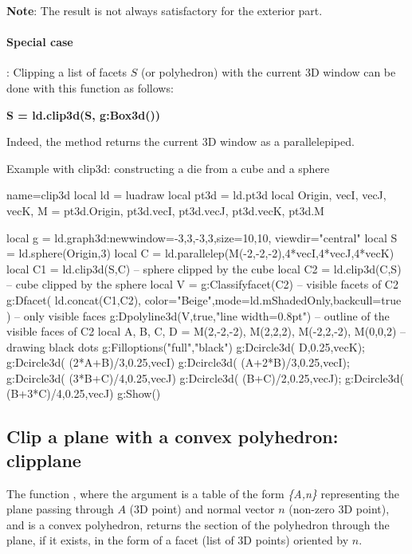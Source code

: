 \textbf{Note}: The result is not always satisfactory for the exterior part.

\paragraph{Special case}: Clipping a list of facets $S$ (or polyhedron) with the current 3D window can be done with this function as follows:

\begin{center}
\textbf{S = ld.clip3d(S, g:Box3d())}
\end{center}

Indeed, the  method returns the current 3D window as a parallelepiped.

\begin{demo}[clip3d]{Example with clip3d: constructing a die from a cube and a sphere}
\begin{luadraw}{name=clip3d}
local ld = luadraw
local pt3d = ld.pt3d
local Origin, vecI, vecJ, vecK, M = pt3d.Origin, pt3d.vecI, pt3d.vecJ, pt3d.vecK, pt3d.M

local g = ld.graph3d:new{window={-3,3,-3,3},size={10,10}, viewdir="central"}
local S = ld.sphere(Origin,3)
local C = ld.parallelep(M(-2,-2,-2),4*vecI,4*vecJ,4*vecK)
local C1 = ld.clip3d(S,C) -- sphere clipped by the cube
local C2 = ld.clip3d(C,S) -- cube clipped by the sphere
local V = g:Classifyfacet(C2) -- visible facets of C2
g:Dfacet( ld.concat(C1,C2), {color="Beige",mode=ld.mShadedOnly,backcull=true} ) -- only visible faces
g:Dpolyline3d(V,true,"line width=0.8pt") -- outline of the visible faces of C2
local A, B, C, D = M(2,-2,-2), M(2,2,2), M(-2,2,-2), M(0,0,2) -- drawing black dots
g:Filloptions("full","black")
g:Dcircle3d( D,0.25,vecK); g:Dcircle3d( (2*A+B)/3,0.25,vecI)
g:Dcircle3d( (A+2*B)/3,0.25,vecI); g:Dcircle3d( (3*B+C)/4,0.25,vecJ)
g:Dcircle3d( (B+C)/2,0.25,vecJ); g:Dcircle3d( (B+3*C)/4,0.25,vecJ)
g:Show()
\end{luadraw}
\end{demo}

\subsection{Clip a plane with a convex polyhedron: clipplane}

The function , where the argument  is a table of the form \emph{\{A,n\}} representing the plane passing through $A$ (3D point) and normal vector $n$ (non-zero 3D point), and  is a convex polyhedron, returns the section of the polyhedron through the plane, if it exists, in the form of a facet (list of 3D points) oriented by $n$.
